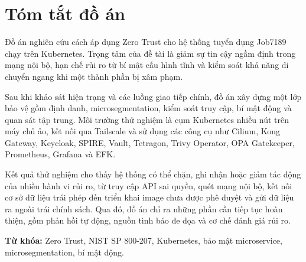 \chapter*{Tóm tắt đồ án}

Đồ án nghiên cứu cách áp dụng Zero Trust cho hệ thống tuyển dụng Job7189 chạy trên Kubernetes. Trọng tâm của đề tài là giảm sự tin cậy ngầm định trong mạng nội bộ, hạn chế rủi ro từ bí mật cấu hình tĩnh và kiểm soát khả năng di chuyển ngang khi một thành phần bị xâm phạm.

Sau khi khảo sát hiện trạng và các luồng giao tiếp chính, đồ án xây dựng một lớp bảo vệ gồm định danh, microsegmentation, kiểm soát truy cập, bí mật động và quan sát tập trung. Môi trường thử nghiệm là cụm Kubernetes nhiều nút trên máy chủ ảo, kết nối qua Tailscale và sử dụng các công cụ như Cilium, Kong Gateway, Keycloak, SPIRE, Vault, Tetragon, Trivy Operator, OPA Gatekeeper, Prometheus, Grafana và EFK.

Kết quả thử nghiệm cho thấy hệ thống có thể chặn, ghi nhận hoặc giảm tác động của nhiều hành vi rủi ro, từ truy cập API sai quyền, quét mạng nội bộ, kết nối cơ sở dữ liệu trái phép đến triển khai image chưa được phê duyệt và gửi dữ liệu ra ngoài trái chính sách. Qua đó, đồ án chỉ ra những phần cần tiếp tục hoàn thiện, gồm phản hồi tự động, nguồn tình báo đe dọa và cơ chế đánh giá rủi ro.

\vspace{0.5cm}
\noindent\textbf{Từ khóa:} Zero Trust, NIST SP 800-207, Kubernetes, bảo mật microservice, microsegmentation, bí mật động.
